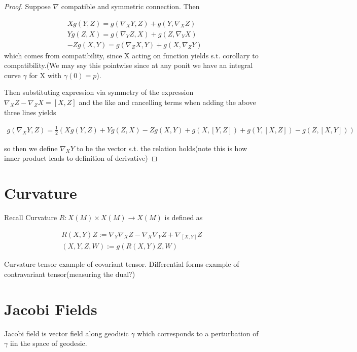 \documentclass[11pt]{article}
\begin{document}
\begin{proof}
	Suppose $\nabla$ compatible and symmetric connection. Then

	\begin{align*}
		&Xg(Y,Z) = g(\nabla_X Y, Z) + g(Y,\nabla_X Z)\\
		&Yg(Z,X) = g(\nabla_Y Z,X) + g(Z,\nabla_Y X)\\
		&-Zg(X,Y) = g(\nabla_Z X,Y) + g(X,\nabla_Z Y)
	\end{align*}
	which comes from compatibility, since X acting on function yields s.t. corollary to compatibility.(We may say this pointwise since at any ponit we have an integral curve $\gamma$ for X with $\gamma(0) = p$). 

	Then substituting expression via symmetry of the expression $\nabla_X Z - \nabla_Z X = [X,Z]$ and the like and cancelling terms when adding the above three lines yields

	\begin{align*}
		g(\nabla_X Y,Z) = \frac{1}{2}(Xg(Y,Z) + Y g(Z,X) - Zg(X,Y) + g(X,[Y,Z]) + g(Y,[X,Z]) - g(Z,[X,Y]))
	\end{align*}

	so then we define $\nabla_X Y$ to be the vector s.t. the relation holds(note this is how inner product leads to definition of derivative)
\end{proof}

\section{Curvature}

Recall Curvature $R : X(M) \times X(M) \to X(M)$ is defined as

\begin{align*}
	R(X,Y)Z := \nabla_Y\nabla_X Z - \nabla_X\nabla_Y Z + \nabla_{[X,Y]}Z \\
	(X,Y,Z,W) := g(R(X,Y)Z,W)
\end{align*}

Curvature tensor example of covariant tensor. Differential forms example of contravariant tensor(measuring the dual?)

\section{Jacobi Fields}

Jacobi field is vector field along geodisic $\gamma$ which corresponds to a perturbation of $\gamma$ iin the space of geodesic.
\end{document}
